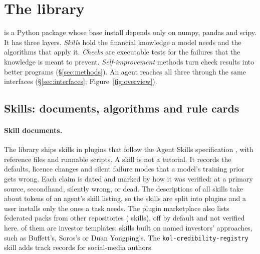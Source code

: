 \section{The \lib{} library}
\label{sec:library}

\lib{} is a Python package whose base install depends only on numpy, pandas and scipy. It
has three layers. \emph{Skills} hold the financial knowledge a model needs and the
algorithms that apply it. \emph{Checks} are executable tests for the failures that the
knowledge is meant to prevent. \emph{Self-improvement} methods turn check results into
better programs (\S\ref{sec:methods}). An agent reaches all three through the same
interfaces (\S\ref{sec:interfaces}; Figure~\ref{fig:overview}).

\subsection{Skills: documents, algorithms and rule cards}
\label{sec:skills}

\paragraph{Skill documents.}
The library ships \NSkills{} skills in \NPlugins{} plugins that follow the Agent Skills
specification \citep{agentskills}, with \NReferenceFiles{} reference files and
\NScripts{} runnable scripts. A skill is not a tutorial. It records the defaults, licence
changes and silent failure modes that a model's training prior gets wrong. Each claim is
dated and marked by how it was verified: at a primary source, secondhand, silently wrong,
or dead. The descriptions of all \NSkills{} skills take about \NListingTokens{} tokens of an
agent's skill listing, so the skills are split into plugins and a user installs only the
ones a task needs.
The plugin marketplace also lists \NFederatedPacks{} federated packs from other repositories
(\NFederatedSkills{} skills), off by default and not verified here. \NLensPacks{} of them are
investor templates: \NLensSkills{} skills built on named investors' approaches, such as
Buffett's, Soros's or Duan Yongping's. The \texttt{kol-credibility-registry} skill adds track
records for \NKOLProfiles{} social-media authors.


